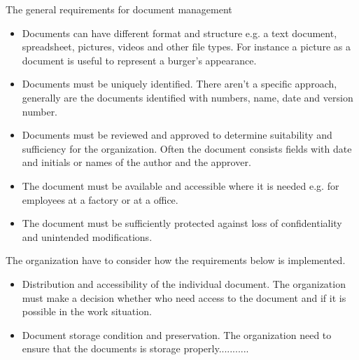 The general requirements for document management
\begin{itemize}
	\item Documents can have different format and structure e.g. a text document, spreadsheet, pictures, videos and other file types. For instance a picture as a document is useful to represent a burger's appearance. 
	\item Documents must be uniquely identified. There aren't a specific approach, generally are the documents identified with numbers, name, date and version number. 
	\item Documents must be reviewed and approved to determine suitability and sufficiency for the organization. Often the document consists fields with date and initials or names of the author and  the approver.
	\item The document must be available and accessible where it is needed e.g. for employees at a factory or at a office. 
	\item The document must be sufficiently protected against loss of confidentiality and unintended modifications. 
\end{itemize}

The organization have to consider how  the requirements below is implemented. 

\begin{itemize}
	\item Distribution and accessibility of the individual document. The organization must make a decision whether who need access to the document and if it is possible in the work situation. 
	\item Document storage condition and preservation. The organization need to ensure that the documents is storage properly........... 
\end{itemize}





